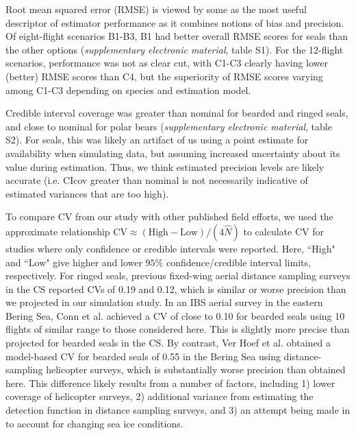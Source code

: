 \documentclass[]{rsos}%
\begin{document}
Root mean squared error (RMSE) is viewed by some as the most useful descriptor of estimator performance as it combines notions of bias and precision.  Of eight-flight scenarios B1-B3, B1 had better overall RMSE scores for seals than the other options (\textit{supplementary electronic material}, table S1).  For the 12-flight scenarios, performance was not as clear cut, with C1-C3 clearly having lower (better) RMSE scores than C4, but the superiority of RMSE scores varying among C1-C3 depending on species and estimation model.

Credible interval coverage was greater than nominal for bearded and ringed seals, and close to nominal for polar bears (\textit{supplementary electronic material}, table S2).  For seals, this was likely an artifact of us using a point estimate for availability when simulating data, but assuming increased uncertainty about its value during estimation.  Thus, we think estimated precision levels are likely accurate (i.e. CIcov greater than nominal is not necessarily indicative of estimated variances that are too high).

To compare CV from our study with other published field efforts, we used the approximate relationship $\textrm{CV} \approx (\textrm{High}-\textrm{Low})/(4 \hat{N})$ to calculate CV for studies where only confidence or credible intervals were reported.  Here, ``High" and ``Low" give higher and lower $95\%$ confidence/credible interval limits, respectively. For ringed seals, previous fixed-wing aerial distance sampling surveys in the CS \cite{Bengtson2005} reported CVs of 0.19 and 0.12, which is similar or worse precision than we projected in our simulation study. In an IBS aerial survey in the eastern Bering Sea, Conn et al. \cite{ConnEtAl2014} achieved a CV of close to 0.10 for bearded seals using 10 flights of similar range to those considered here.  This is slightly more precise than projected for bearded seals in the CS.  By contrast, Ver Hoef et al. \cite{VerHoefEtAl2014} obtained a model-based CV for bearded seals of 0.55 in the Bering Sea using distance-sampling helicopter surveys, which is substantially worse precision than obtained here.  This difference likely results from a number of factors, including 1) lower coverage of helicopter surveys, 2) additional variance from estimating the detection function in distance sampling surveys, and 3) an attempt being made in \cite{VerHoefEtAl2014} to account for changing sea ice conditions.
\end{document}
